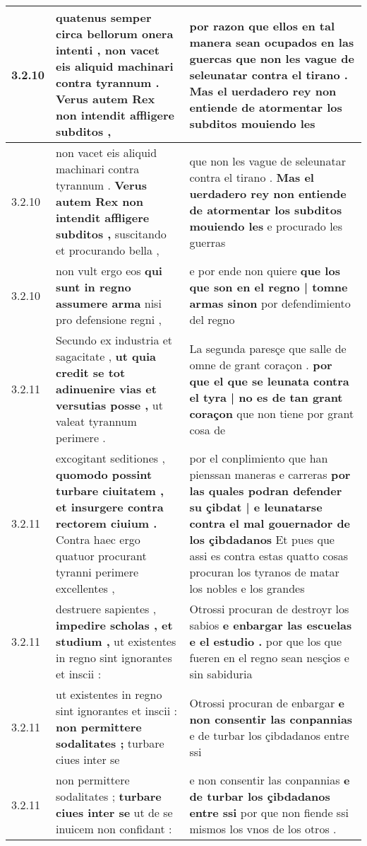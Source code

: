 \begin{tabular}{|p{1cm}|p{6.5cm}|p{6.5cm}|}
3.2.10 & quatenus semper circa bellorum onera intenti , \textbf{ non vacet eis aliquid machinari contra tyrannum . } Verus autem Rex non intendit affligere subditos , & por razon que ellos en tal manera sean ocupados en las guercas \textbf{ que non les vague de seleunatar contra el tirano . } Mas el uerdadero rey non entiende de atormentar los subditos mouiendo les \\\hline
3.2.10 & non vacet eis aliquid machinari contra tyrannum . \textbf{ Verus autem Rex non intendit affligere subditos , } suscitando et procurando bella , & que non les vague de seleunatar contra el tirano . \textbf{ Mas el uerdadero rey non entiende de atormentar los subditos mouiendo les } e procurado les guerras \\\hline
3.2.10 & non vult ergo eos \textbf{ qui sunt in regno assumere arma } nisi pro defensione regni , & e por ende non quiere \textbf{ que los que son en el regno | tomne armas sinon } por defendimiento del regno \\\hline
3.2.11 & Secundo ex industria et sagacitate , \textbf{ ut quia credit se tot adinuenire vias et versutias posse , } ut valeat tyrannum perimere . & La segunda paresçe que salle de omne de grant coraçon . \textbf{ por que el que se leunata contra el tyra | no es de tan grant coraçon } que non tiene por grant cosa de \\\hline
3.2.11 & excogitant seditiones , \textbf{ quomodo possint turbare ciuitatem , et insurgere contra rectorem ciuium . } Contra haec ergo quatuor procurant tyranni perimere excellentes , & por el conplimiento que han pienssan maneras e carreras \textbf{ por las quales podran defender su çibdat | e leunatarse contra el mal gouernador de los çibdadanos } Et pues que assi es contra estas quatto cosas procuran los tyranos de matar los nobles e los grandes \\\hline
3.2.11 & destruere sapientes , \textbf{ impedire scholas , et studium , } ut existentes in regno sint ignorantes et inscii : & Otrossi procuran de destroyr los sabios \textbf{ e enbargar las escuelas e el estudio . } por que los que fueren en el regno sean nesçios e sin sabiduria \\\hline
3.2.11 & ut existentes in regno sint ignorantes et inscii : \textbf{ non permittere sodalitates ; } turbare ciues inter se & Otrossi procuran de enbargar \textbf{ e non consentir las conpannias } e de turbar los çibdadanos entre ssi \\\hline
3.2.11 & non permittere sodalitates ; \textbf{ turbare ciues inter se } ut de se inuicem non confidant : & e non consentir las conpannias \textbf{ e de turbar los çibdadanos entre ssi } por que non fiende ssi mismos los vnos de los otros . \\\hline

\end{tabular}
